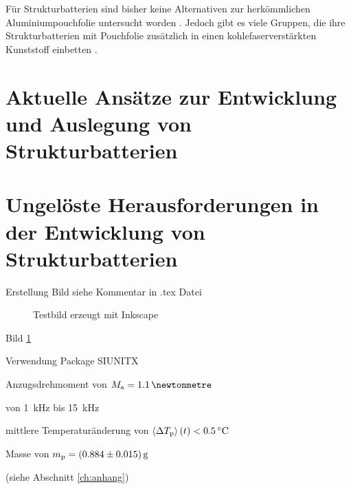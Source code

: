 Für Strukturbatterien sind bisher keine Alternativen zur herkömmlichen Aluminiumpouchfolie untersucht worden \cite{Ye2024}. Jedoch gibt es viele Gruppen, die ihre Strukturbatterien mit Pouchfolie zusätzlich in einen kohlefaserverstärkten Kunststoff einbetten \cite{Pattarakunnan2020,Asp2021}.

\section{Aktuelle Ansätze zur Entwicklung und Auslegung von Strukturbatterien}

\section{Ungelöste Herausforderungen in der Entwicklung von Strukturbatterien}
Erstellung Bild siehe Kommentar in .tex Datei


\begin{figure}[h]
	\def\svgscale{0.98}
		 
		\caption{\label{fig:testbild}Testbild erzeugt mit Inkscape}
\end{figure}

Bild \ref{fig:testbild} %

Verwendung Package SIUNITX %

Anzugsdrehmoment von $M_{\textnormal{a}}=\SI{1.1}{\newtonmetre}$

von \SI{1}{\kilo\hertz} bis \SI{15}{\kilo\hertz}

mittlere Temperaturänderung von $\left\langle \Delta T_{\textnormal{p}}\right\rangle(t)<\SI{0.5}{\degreeCelsius}$

Masse von $m_{\textnormal{p}}=\SI[separate-uncertainty]{0.884 (15)}{\gram}$

(siehe Abschnitt \ref{ch:anhang})